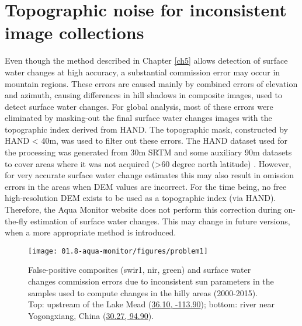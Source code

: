 

\section{Topographic noise for inconsistent image collections}
Even though the method described in Chapter \ref{ch5} allows detection of surface water changes at high accuracy, a substantial commission error may occur in mountain regions. These errors are caused mainly by combined errors of elevation and azimuth, causing differences in hill shadows in composite images, used to detect surface water changes. For global analysis, most of these errors were eliminated by masking-out the final surface water changes images with the topographic index derived from \gls{HAND}. The topographic mask, constructed by HAND < 40m, was used to filter out these errors. The \gls{HAND} dataset used for the processing was generated from 30m \gls{SRTM} and some auxiliary 90m datasets to cover areas where it was not acquired (>60 degree north latitude) \citet{donchyts2016hand}. However, for very accurate surface water change estimates this may also result in omission errors in the areas when DEM values are incorrect. For the time being, no free high-resolution DEM exists to be used as a topographic index (via \gls{HAND}). Therefore, the Aqua Monitor website does not perform this correction during on-the-fly estimation of surface water changes. This may change in future versions, when a more appropriate method is introduced.

\begin{figure}
	\centering
	\texttt{[image: 01.8-aqua-monitor/figures/problem1]}
	\caption{False-positive composites (swir1, nir, green) and surface water changes commission errors due to inconsistent sun parameters in the samples used to compute changes in the hilly areas (2000-2015). Top: upstream of the Lake Mead (\href{http://aqua-monitor.appspot.com/?from=2000&to=2013&view=36.103119715292486,-113.93795967102045,13z&max_doy=365}{36.10, -113.90}); bottom: river near Yogongxiang, China (\href{http://aqua-monitor.appspot.com/?mode=dynamic&from=2000&to=2013&view=30.269128374988604,94.89677429199217,12z&max_doy=365&averaging_months1=36&averaging_months2=36}{30.27, 94.90}).}
	\label{fig:am-topographic-errors}
\end{figure}


